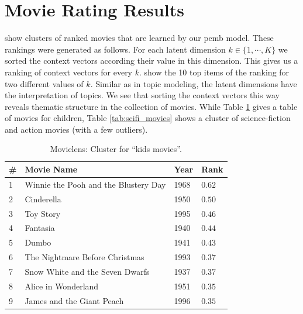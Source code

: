 \documentclass[12pt]{article}
\begin{document}
\section{Movie Rating Results}
\label{sec:movie}
 show clusters of ranked movies that are learned by our \gls{pemb} model.
These rankings were generated as follows. For each latent dimension $k\in\{1,\cdots,K\}$ we sorted the context vectors according their value in this dimension.
This gives us a ranking of context vectors for every $k$. 
 show the 10 top items of the ranking for two different values of $k$. Similar as in topic modeling, the latent dimensions have the interpretation of topics. We see that sorting the context vectors this way reveals thematic structure in the collection of movies. While Table \ref{tab:kids_movies} gives a table of movies for children, Table \ref{tab:scifi_movies} shows a cluster of science-fiction and action movies (with a few outliers). 
\begin{table}[h]
\centering
\begin{tabular}{llll}\toprule
	\# & Movie Name                         & Year &  Rank       \\ \hline
1 & Winnie the Pooh and the Blustery Day & 1968 & $0.62$ \\
2 & Cinderella & 1950 & $0.50$ \\
3 & Toy Story & 1995 & $0.46$ \\
4 & Fantasia & 1940 & $0.44$ \\
5 & Dumbo & 1941 & $0.43$ \\
6 & The Nightmare Before Christmas & 1993 & $0.37$ \\
7 & Snow White and the Seven Dwarfs & 1937 & $0.37$ \\
8 & Alice in Wonderland & 1951 & $0.35$ \\
9 & James and the Giant Peach & 1996 & $0.35$ \\ \bottomrule
\end{tabular}
\caption{\label{tab:kids_movies} Movielens: Cluster for ``kids movies''.}
\end{table}
\end{document}

